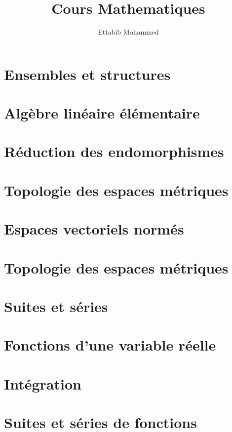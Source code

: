 \documentclass{MathBook}
\begin{document}
\title{Cours Mathematiques}
\author{Ettabib Mohammed}
\date{}
\maketitle

\tableofcontents
\chapter{Ensembles et structures }
\chapter{ Algèbre linéaire élémentaire}
\chapter{ Réduction des endomorphismes }
\chapter{ Topologie des espaces métriques }
\chapter{Espaces vectoriels normés }
\chapter{Topologie des espaces métriques}

% 
% 
\chapter{ Suites et séries }
\chapter{Fonctions d’une variable réelle }
\chapter{Intégration }
\chapter{Suites et séries de fonctions }




\end{document}
